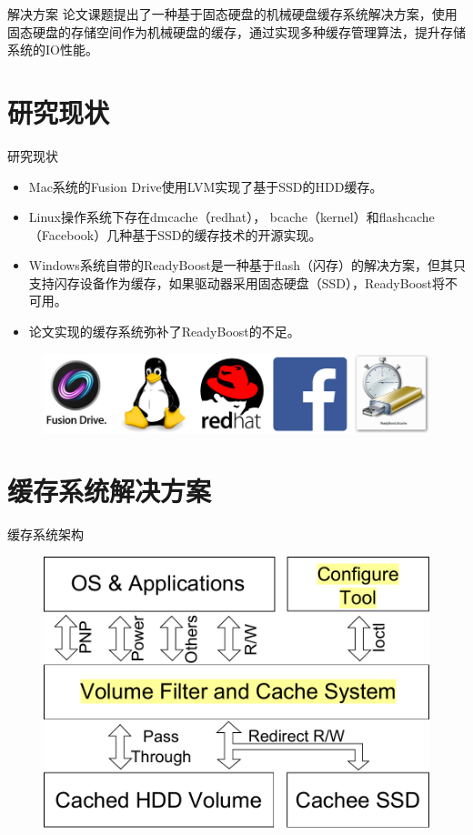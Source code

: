 \documentclass[compress]{beamer}
\begin{document}
\begin{frame}{解决方案}
论文课题提出了一种基于固态硬盘的机械硬盘缓存系统解决方案，使用固态硬盘的存储空间作为机械硬盘的缓存，通过实现多种缓存管理算法，提升存储系统的IO性能。
\end{frame}

\section{研究现状}
\begin{frame}{研究现状}
\begin{itemize}
    \item Mac系统的Fusion Drive使用LVM实现了基于SSD的HDD缓存。
    \item Linux操作系统下存在dmcache（redhat）， bcache（kernel）和flashcache（Facebook）几种基于SSD的缓存技术的开源实现。
    \item Windows系统自带的ReadyBoost是一种基于flash（闪存）的解决方案，但其只支持闪存设备作为缓存，如果驱动器采用固态硬盘（SSD），ReadyBoost将不可用。
    \item 论文实现的缓存系统弥补了ReadyBoost的不足。
\end{itemize}
\begin{figure}
\includegraphics[width=0.5\linewidth]{./fig/research-status}
\end{figure}
\end{frame}

\section{缓存系统解决方案}
\begin{frame}{缓存系统架构}
\begin{figure}
\includegraphics[width=0.8\linewidth]{./fig/sys-overview}
\end{figure}
\end{frame}
\end{document}
